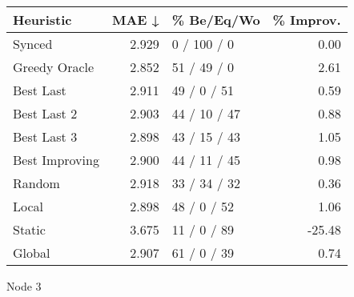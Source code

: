 \begin{tabular}{lrlr}
\toprule
\textbf{Heuristic} & \textbf{MAE ↓} & \textbf{\% Be/Eq/Wo} & \textbf{\% Improv.} \\
\midrule
            Synced &          2.929 &          0 / 100 / 0 &                0.00 \\
     Greedy Oracle &          2.852 &          51 / 49 / 0 &                2.61 \\
         Best Last &          2.911 &          49 / 0 / 51 &                0.59 \\
       Best Last 2 &          2.903 &         44 / 10 / 47 &                0.88 \\
       Best Last 3 &          2.898 &         43 / 15 / 43 &                1.05 \\
    Best Improving &          2.900 &         44 / 11 / 45 &                0.98 \\
            Random &          2.918 &         33 / 34 / 32 &                0.36 \\
             Local &          2.898 &          48 / 0 / 52 &                1.06 \\
            Static &          3.675 &          11 / 0 / 89 &              -25.48 \\
            Global &          2.907 &          61 / 0 / 39 &                0.74 \\
\bottomrule
\end{tabular}
\caption{Node 3}
\label{tab:hr_non_lr01_le2_bs4_3}
